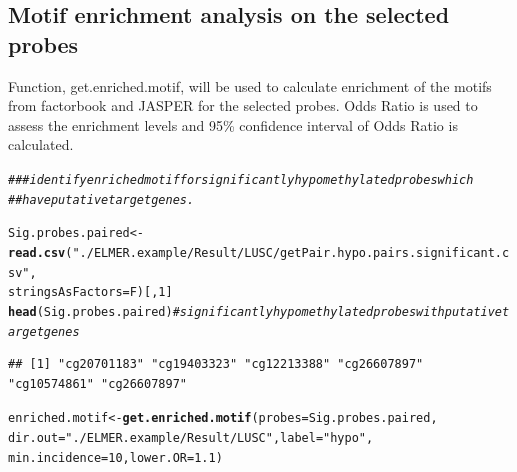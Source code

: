 \documentclass{article}\usepackage[]{graphicx}\usepackage[usenames,dvipsnames]{color}
\makeatletter
\newcommand{\hlnum}[1]{\textcolor[rgb]{0.686,0.059,0.569}{#1}}%
\newcommand{\hlstr}[1]{\textcolor[rgb]{0.192,0.494,0.8}{#1}}%
\newcommand{\hlcom}[1]{\textcolor[rgb]{0.678,0.584,0.686}{\textit{#1}}}%
\newcommand{\hlstd}[1]{\textcolor[rgb]{0.345,0.345,0.345}{#1}}%
\newcommand{\hlkwb}[1]{\textcolor[rgb]{0.69,0.353,0.396}{#1}}%
\newcommand{\hlkwc}[1]{\textcolor[rgb]{0.333,0.667,0.333}{#1}}%
\newcommand{\hlkwd}[1]{\textcolor[rgb]{0.737,0.353,0.396}{\textbf{#1}}}%
\newenvironment{kframe}{%
 \def\at@end@of@kframe{}%
 \ifinner\ifhmode%
  \def\at@end@of@kframe{\end{minipage}}%
  \begin{minipage}{\columnwidth}%
 \fi\fi%
 \def\FrameCommand##1{\hskip\@totalleftmargin \hskip-\fboxsep
 \colorbox{shadecolor}{##1}\hskip-\fboxsep
     \hskip-\linewidth \hskip-\@totalleftmargin \hskip\columnwidth}%
 \MakeFramed {\advance\hsize-\width
   \@totalleftmargin\z@ \linewidth\hsize
   \@setminipage}}%
 {\par\unskip\endMakeFramed%
 \at@end@of@kframe}
\newenvironment{knitrout}{}{} %
\makeatother
\begin{document}
\subsection{Motif enrichment analysis on the selected probes}
Function, get.enriched.motif, will be used to calculate enrichment of the motifs from 
factorbook and JASPER for the selected probes. Odds Ratio is used to assess 
the enrichment levels and 95\% confidence interval of Odds Ratio is calculated.
\begin{knitrout}
\color{fgcolor}\begin{kframe}
\begin{alltt}
\hlcom{### identify enriched motif for significantly hypomethylated probes which }
\hlcom{##have putative target genes.}

\hlstd{Sig.probes.paired} \hlkwb{<-} \hlkwd{read.csv}\hlstd{(}\hlstr{"./ELMER.example/Result/LUSC/getPair.hypo.pairs.significant.csv"}\hlstd{,}
                              \hlkwc{stringsAsFactors}\hlstd{=F)[,}\hlnum{1}\hlstd{]}
\hlkwd{head}\hlstd{(Sig.probes.paired)} \hlcom{# significantly hypomethylated probes with putative target genes}
\end{alltt}
\begin{verbatim}
## [1] "cg20701183" "cg19403323" "cg12213388" "cg26607897" "cg10574861" "cg26607897"
\end{verbatim}
\begin{alltt}
\hlstd{enriched.motif} \hlkwb{<-}\hlkwd{get.enriched.motif}\hlstd{(}\hlkwc{probes}\hlstd{=Sig.probes.paired,}
                                    \hlkwc{dir.out}\hlstd{=}\hlstr{"./ELMER.example/Result/LUSC"}\hlstd{,} \hlkwc{label}\hlstd{=}\hlstr{"hypo"}\hlstd{,}
                                    \hlkwc{min.incidence} \hlstd{=} \hlnum{10}\hlstd{,}\hlkwc{lower.OR} \hlstd{=} \hlnum{1.1}\hlstd{)}
\end{alltt}



\end{kframe}
\end{knitrout}
\end{document}
